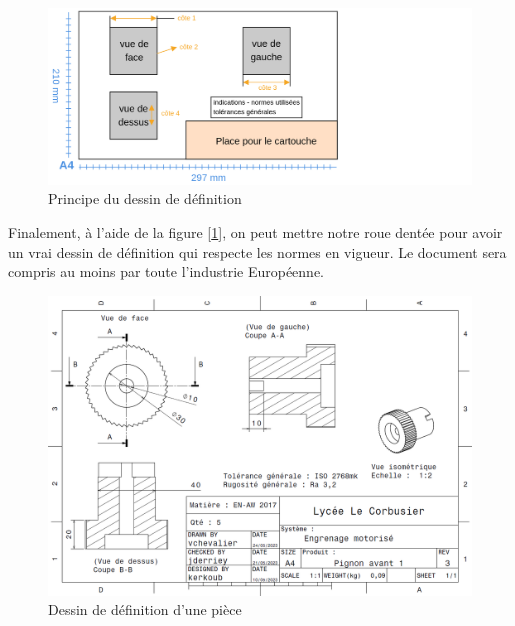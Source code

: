 \documentclass[
	11pt, %
	fleqn, %
	a4paper, %
]{LegrandOrangeBook}
\begin{document}
\begin{figure}[H] %
	\centering %
	\includegraphics[width=1.3\textwidth]{Images/cartouche.png} %
	\caption{Principe du dessin de définition}
	\label{cart} %
\end{figure}

Finalement, à l'aide de la figure [\ref{cart}], on peut mettre notre roue dentée pour avoir un vrai dessin de définition qui respecte les normes en vigueur. Le document sera compris au moins par toute l'industrie Européenne. 


\begin{figure}[H] %
	\centering %
	\includegraphics[width=1.1\textwidth]{Images/pignon1.PNG} %
	\caption{Dessin de définition d'une pièce}
	\label{pignon1} %
\end{figure}
\end{document}

